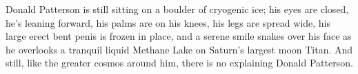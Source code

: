 Donald Patterson is still sitting on a boulder of cryogenic ice; his
eyes are closed, he's leaning forward, his palms are on his knees, his
legs are spread wide, his large erect bent penis is frozen in place, and
a serene smile snakes over his face as he overlooks a tranquil liquid
Methane Lake on Saturn's largest moon Titan. And still, like the greater
cosmos around him, there is no explaining Donald Patterson.


%
 
